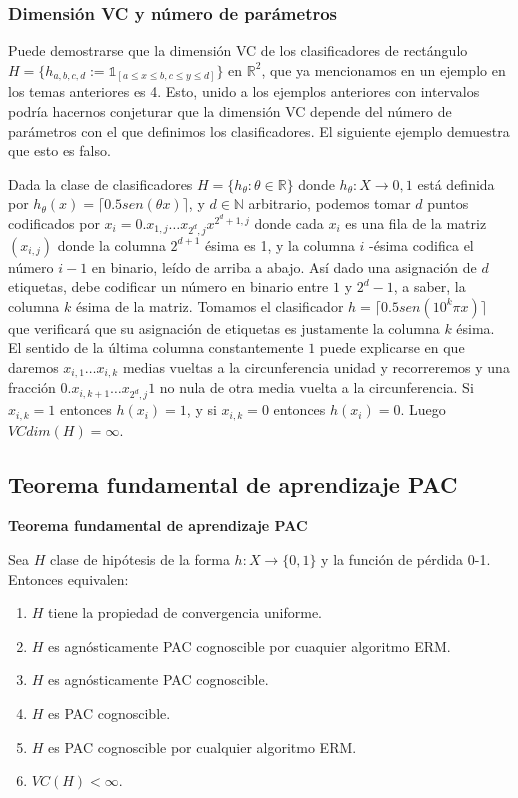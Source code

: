 \subsubsection{Dimensión VC y número de parámetros}

Puede demostrarse que la dimensión VC de los clasificadores de rectángulo $H = \{h_{a,b,c,d} := \mathds{1}_{[a\le x\le b, c\le y\le d]}\}$ en $\mathbb{R}^2$, que ya mencionamos en un ejemplo en los temas anteriores es 4. Esto, unido a los ejemplos anteriores con intervalos podría hacernos conjeturar que la dimensión VC depende del número de parámetros con el que definimos los clasificadores. El siguiente ejemplo demuestra que esto es falso.

Dada la clase de clasificadores $H = \{h_{\theta}: \theta \in \mathbb{R}\}$ donde 
$h_{\theta}: X \rightarrow {0,1}$ está definida por $h_\theta (x) = \lceil 0.5 sen(\theta x) \rceil$, y 
$d\in \mathbb{N}$ arbitrario, podemos tomar $d$ puntos codificados por $x_i = 0.x_{1,j} \ldots x_{2^d,j} x^{2^d + 1,j}$ 
donde cada $x_{i}$ es una fila de la matriz $(x_{i,j})$ donde la columna $2^{d+1}$ ésima es 1, y la columna 
$i$ -ésima codifica el número $i-1$ en binario, leído de arriba a abajo. Así dado una asignación de $d$ 
etiquetas, debe codificar un número en binario entre $1$ y $2^d-1$, a saber, la columna $k$ ésima de la 
matriz. Tomamos el clasificador $h = \lceil 0.5 sen(10^k \pi x) \rceil$ que verificará que su asignación de 
etiquetas es justamente la columna $k$ ésima. El sentido de la última columna constantemente $1$ puede 
explicarse en que daremos $x_{i,1} \ldots x_{i,k}$ medias vueltas a la circunferencia unidad y recorreremos 
y una fracción $0.x_{i,k+1} \ldots x_{2^d,j} 1$ no nula de otra media vuelta a la circunferencia. Si 
$x_{i,k} = 1$ entonces $h(x_i) = 1$, y si $x_{i,k}=0$ entonces $h(x_i) = 0$. Luego $VCdim(H) = \infty$.

\subsection{Teorema fundamental de aprendizaje PAC}

\begin{theorem}
\textbf{Teorema fundamental de aprendizaje PAC}

Sea $H$ clase de hipótesis de la forma $h: X \rightarrow \{0,1\}$ y la función de pérdida 0-1. Entonces equivalen:

\begin{enumerate}
\item $H$ tiene la propiedad de convergencia uniforme.
\item $H$ es agnósticamente PAC cognoscible por cuaquier algoritmo ERM.
\item $H$ es agnósticamente PAC cognoscible.
\item $H$ es PAC cognoscible.
\item $H$ es PAC cognoscible por cualquier algoritmo ERM.
\item $VC (H) < \infty$.
\end{enumerate}
\end{theorem}


